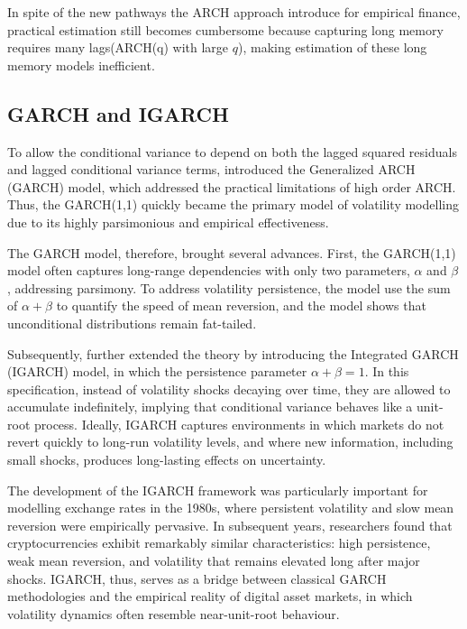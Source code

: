 \documentclass[12pt]{report}
\begin{document}
In spite of the new pathways the ARCH approach introduce for empirical finance, practical estimation still becomes cumbersome because capturing long memory requires many lags(ARCH(q) with large \( q \)), making estimation of these long memory models inefficient.

\subsection{GARCH and IGARCH}
To allow the conditional variance to depend on both the lagged squared residuals and lagged conditional variance terms, \cite{bollerslev1986garch} introduced the Generalized ARCH (GARCH) model, which addressed the practical limitations of high order ARCH. Thus, the GARCH(1,1) quickly became the primary model of volatility modelling due to its highly parsimonious and empirical effectiveness.

The GARCH model, therefore, brought several advances. First, the GARCH(1,1) model often captures long-range dependencies with only two parameters, \(\alpha\) and \(\beta\), addressing parsimony. To address volatility persistence, the model use the sum of \(\alpha + \beta\) to quantify the speed of mean reversion, and the model shows that unconditional distributions remain fat-tailed.

Subsequently, \cite{englebollerslev1986persistence} further extended the theory by introducing the Integrated GARCH (IGARCH) model, in which the persistence parameter \(\alpha + \beta = 1\). In this specification, instead of volatility shocks decaying over time, they are allowed to accumulate indefinitely, implying that conditional variance behaves like 
a unit-root process. Ideally, IGARCH captures environments in which markets 
do not revert quickly to long-run volatility levels, and where new information, including small shocks, produces long-lasting effects on uncertainty.

The development of the IGARCH framework was particularly important for modelling exchange rates in the 1980s, where persistent volatility and slow mean reversion were empirically pervasive. 
In subsequent years, researchers found that cryptocurrencies exhibit remarkably similar characteristics: 
high persistence, weak mean reversion, and volatility that remains elevated long after major shocks. IGARCH, thus, serves as a bridge between classical GARCH methodologies and the empirical reality of digital asset markets, in which volatility dynamics often resemble near-unit-root behaviour.
\end{document}
